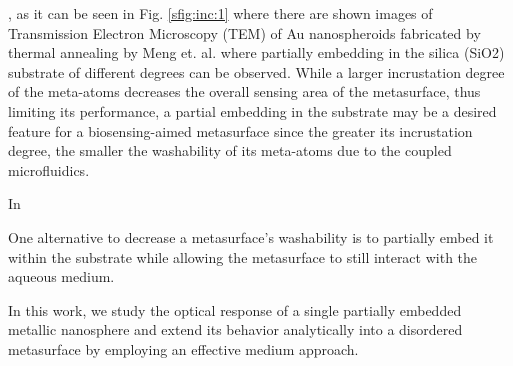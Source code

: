 

, as it can be seen in Fig. \ref{sfig:inc:1} where there are shown images of Transmission Electron Microscopy (TEM) of Au nanospheroids fabricated by thermal annealing by Meng et. al. \cite{meng_anisotropic_2015} where partially embedding  in the silica (SiO2) substrate of different degrees can be observed. While a larger incrustation degree of the meta-atoms decreases the overall sensing area of the metasurface, thus limiting its performance, a partial embedding in the substrate may be a desired feature for a biosensing-aimed metasurface since the greater its incrustation degree, the smaller the washability  of its meta-atoms due to the coupled microfluidics. 

 In


 One alternative to decrease a metasurface's washability is to partially embed it within the substrate while allowing the metasurface to still interact with the aqueous medium. 
 
 
 In this work, we study the optical response of a single partially embedded metallic nanosphere  and extend its behavior analytically into a disordered metasurface by employing an effective medium approach.





